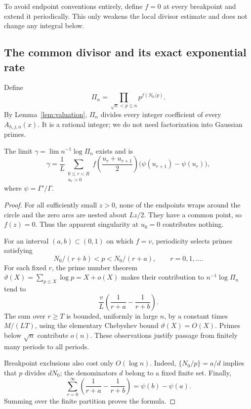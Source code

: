 To avoid endpoint conventions entirely, define \(f=0\) at every
breakpoint and extend it periodically. This only weakens the local
divisor estimate and does not change any integral below.

\subsection{The common divisor and its exact exponential rate}

Define
\begin{equation}\label{eq:Pi}
\Pi_n=\prod_{\sqrt n<p\le n}p^{f(N_0/p)}.
\end{equation}
By Lemma~\ref{lem:valuation}, \(\Pi_n\) divides every integer
coefficient of every \(A_{h,j,n}(x)\). It is a rational integer;
we do not need factorization into Gaussian primes.

\begin{proposition}\label{prop:gamma}
The limit \(\gamma=\lim n^{-1}\log\Pi_n\) exists and is
\begin{equation}\label{eq:gamma}
\boxed{\displaystyle
\gamma=\frac1L\sum_{\substack{0\le r<R\\u_r>0}}
 f\!\left(\frac{u_r+u_{r+1}}2\right)
 \bigl(\psi(u_{r+1})-\psi(u_r)\bigr),}
\end{equation}
where \(\psi=\Gamma'/\Gamma\).
\end{proposition}
\begin{proof}
For all sufficiently small \(z>0\), none of the endpoints wraps
around the circle and the zero arcs are nested about \(Lz/2\).
They have a common point, so \(f(z)=0\). Thus the apparent singularity
at \(u_0=0\) contributes nothing.

For an interval \((a,b)\subset(0,1)\) on which \(f=v\), periodicity
selects primes satisfying
\[
N_0/(r+b)<p<N_0/(r+a),\qquad r=0,1,\ldots.
\]
For each fixed \(r\), the prime number theorem
\(\vartheta(X)=\sum_{p\le X}\log p=X+o(X)\) makes their contribution
to \(n^{-1}\log\Pi_n\) tend to
\[
\frac vL\left(\frac1{r+a}-\frac1{r+b}\right).
\]
The sum over \(r\ge T\) is bounded, uniformly in large \(n\), by a
constant times \(M/(LT)\), using the elementary Chebyshev bound
\(\vartheta(X)=O(X)\). Primes below \(\sqrt n\) contribute \(o(n)\).
These observations justify passage from finitely many periods to all
periods.

Breakpoint exclusions also cost only \(O(\log n)\). Indeed,
\(\{N_0/p\}=a/d\) implies that \(p\) divides \(dN_0\);
the denominators \(d\) belong to a fixed finite set.
Finally,
\[
\sum_{r=0}^{\infty}
\left(\frac1{r+a}-\frac1{r+b}\right)=\psi(b)-\psi(a).
\]
Summing over the finite partition proves the formula.
\end{proof}


